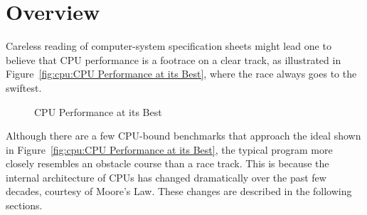
\section{Overview}
\label{sec:cpu:Overview}

Careless reading of computer-system specification sheets might lead one
to believe that CPU performance is a footrace on a clear track, as
illustrated in Figure~\ref{fig:cpu:CPU Performance at its Best},
where the race always goes to the swiftest.

\begin{figure}[htb]
\begin{center}
\end{center}
\caption{CPU Performance at its Best}
\end{figure}

Although there are a few CPU-bound benchmarks that approach the ideal
shown in Figure~\ref{fig:cpu:CPU Performance at its Best},
the typical program more closely resembles an obstacle course than
a race track.
This is because the internal architecture of CPUs has changed dramatically
over the past few decades, courtesy of Moore's Law.
These changes are described in the following sections.

